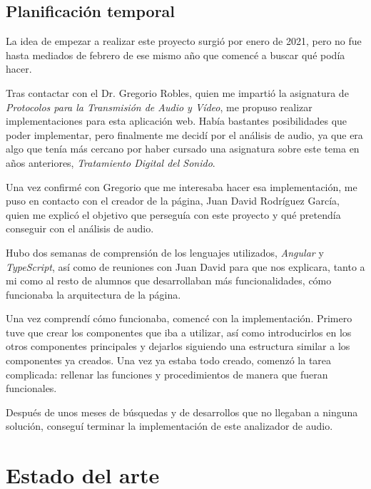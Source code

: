 \documentclass[a4paper, 12pt]{book}
\begin{document}
\section{Planificación temporal}
\label{sec:planificacion-temporal}

La idea de empezar a realizar este proyecto surgió por enero de 2021, pero no fue hasta mediados de febrero de ese mismo año que comencé a buscar qué podía hacer.

Tras contactar con el Dr. Gregorio Robles, quien me impartió la asignatura de \textit{Protocolos para la Transmisión de Audio y Vídeo}, me propuso realizar implementaciones para esta aplicación web. Había bastantes posibilidades que poder implementar, pero finalmente me decidí por el análisis de audio, ya que era algo que tenía más cercano por haber cursado una asignatura sobre este tema en años anteriores, \textit{Tratamiento Digital del Sonido}.

Una vez confirmé con Gregorio que me interesaba hacer esa implementación, me puso en contacto con el creador de la página, Juan David Rodríguez García, quien me explicó el objetivo que perseguía con este proyecto y qué pretendía conseguir con el análisis de audio.

Hubo dos semanas de comprensión de los lenguajes utilizados, \textit{Angular} y \textit{TypeScript}, así como de reuniones con Juan David para que nos explicara, tanto a mi como al resto de alumnos que desarrollaban más funcionalidades, cómo funcionaba la arquitectura de la página.

Una vez comprendí cómo funcionaba, comencé con la implementación. Primero tuve que crear los componentes que iba a utilizar, así como introducirlos en los otros componentes principales y dejarlos siguiendo una estructura similar a los componentes ya creados. Una vez ya estaba todo creado, comenzó la tarea complicada: rellenar las funciones y procedimientos de manera que fueran funcionales.

Después de unos meses de búsquedas y de desarrollos que no llegaban a ninguna solución, conseguí terminar la implementación de este analizador de audio.



\cleardoublepage
\chapter{Estado del arte}
\label{chap:estado}
\end{document}
